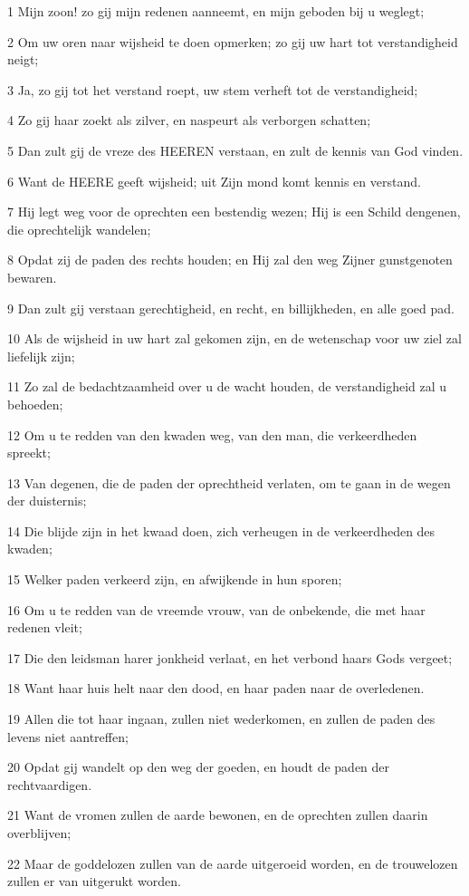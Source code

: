 \par 1 Mijn zoon! zo gij mijn redenen aanneemt, en mijn geboden bij u weglegt;
\par 2 Om uw oren naar wijsheid te doen opmerken; zo gij uw hart tot verstandigheid neigt;
\par 3 Ja, zo gij tot het verstand roept, uw stem verheft tot de verstandigheid;
\par 4 Zo gij haar zoekt als zilver, en naspeurt als verborgen schatten;
\par 5 Dan zult gij de vreze des HEEREN verstaan, en zult de kennis van God vinden.
\par 6 Want de HEERE geeft wijsheid; uit Zijn mond komt kennis en verstand.
\par 7 Hij legt weg voor de oprechten een bestendig wezen; Hij is een Schild dengenen, die oprechtelijk wandelen;
\par 8 Opdat zij de paden des rechts houden; en Hij zal den weg Zijner gunstgenoten bewaren.
\par 9 Dan zult gij verstaan gerechtigheid, en recht, en billijkheden, en alle goed pad.
\par 10 Als de wijsheid in uw hart zal gekomen zijn, en de wetenschap voor uw ziel zal liefelijk zijn;
\par 11 Zo zal de bedachtzaamheid over u de wacht houden, de verstandigheid zal u behoeden;
\par 12 Om u te redden van den kwaden weg, van den man, die verkeerdheden spreekt;
\par 13 Van degenen, die de paden der oprechtheid verlaten, om te gaan in de wegen der duisternis;
\par 14 Die blijde zijn in het kwaad doen, zich verheugen in de verkeerdheden des kwaden;
\par 15 Welker paden verkeerd zijn, en afwijkende in hun sporen;
\par 16 Om u te redden van de vreemde vrouw, van de onbekende, die met haar redenen vleit;
\par 17 Die den leidsman harer jonkheid verlaat, en het verbond haars Gods vergeet;
\par 18 Want haar huis helt naar den dood, en haar paden naar de overledenen.
\par 19 Allen die tot haar ingaan, zullen niet wederkomen, en zullen de paden des levens niet aantreffen;
\par 20 Opdat gij wandelt op den weg der goeden, en houdt de paden der rechtvaardigen.
\par 21 Want de vromen zullen de aarde bewonen, en de oprechten zullen daarin overblijven;
\par 22 Maar de goddelozen zullen van de aarde uitgeroeid worden, en de trouwelozen zullen er van uitgerukt worden.

